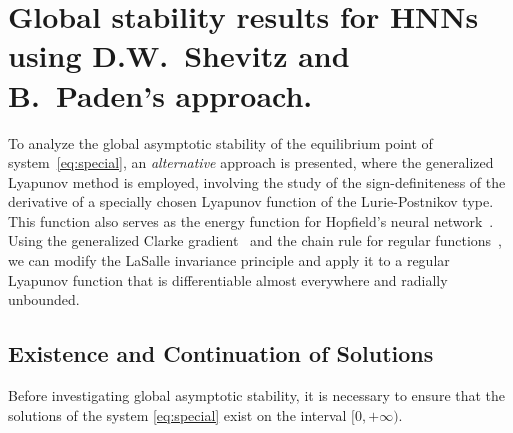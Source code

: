 \documentclass[journal]{IEEEtran}
\newtheorem{theorem}{Theorem}
\begin{document}

\section{Global stability results for HNNs using D.W.~Shevitz and B.~Paden's approach.} \label{app:proofs}


To analyze the global asymptotic stability of the equilibrium point of system~\eqref{eq:special}, 
an \emph{alternative} approach is presented, where the 
generalized Lyapunov method \cite{p9} is employed, 
involving the study of the sign-definiteness of the derivative of a specially chosen Lyapunov function of the Lurie-Postnikov type.
This function also serves as the energy function for Hopfield's neural network~\cite{p10}.
Using the generalized Clarke gradient~\cite{p14} and the chain rule for regular functions~\cite{p9},
we can modify the LaSalle invariance principle \cite[Cor. 4.2, p. 129]{p223}
and apply it to a regular Lyapunov function that is differentiable almost everywhere and radially unbounded.

\subsection{Existence and Continuation of Solutions}
Before investigating global asymptotic stability, it is necessary to ensure that the solutions of the system \eqref{eq:special} exist on the interval $[0, +\infty)$.
\end{document}
